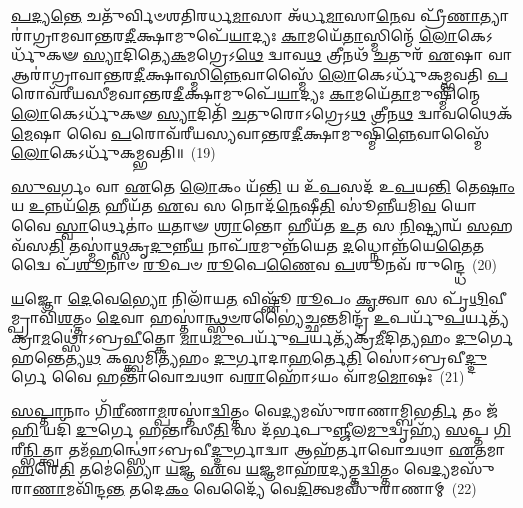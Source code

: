 \-\ul{𑌪}\-\-\ul{𑌦𑍍𑌯}\-\-\ul{𑌨𑍍𑌤𑍇} 𑌚𑌤𑍁᳴𑌰𑍍𑌵𑌿𑍞𑌶𑌤𑌿𑌰𑌰𑍍𑌧\-\ul{𑌮𑌾}\-𑌸𑌾 𑌅᳴𑌰𑍍𑌧\-\ul{𑌮𑌾}\-𑌸𑌾\-\ul{𑌨𑍇}\-𑌵 𑌪𑍍𑌰𑍀᳴\-\ul{𑌣𑌾}\-𑌤𑍍𑌯𑌾𑌰𑌾॑𑌗𑍍𑌰𑌾𑌮𑌵𑌾𑌨𑍍𑌤𑌰\-\ul{𑌦𑍀}\-𑌕𑍍𑌷𑌾𑌮𑍁𑌪𑍇᳴\-\ul{𑌯𑌾}\-𑌦𑍍𑌯𑌃 \ul{𑌕𑌾}\-𑌮𑌯𑍇᳴\-\ul{𑌤𑌾}\-𑌸𑍍𑌮𑌿𑌨𑍍𑌮𑍇᳴ \ul{𑌲𑍋}\-𑌕𑍇\-𑌽𑌰𑍍𑌧𑍁᳴𑌕𑍟 \ul{𑌸𑍍𑌯𑌾}\-𑌦𑌿𑌤𑍍𑌯𑍇\-\ul{𑌕}\-𑌮𑌗𑍍𑌰𑍇\-𑌽\-\ul{𑌥𑍇} 𑌦𑍍𑌵𑌾𑌵\-\ul{𑌥} 𑌤𑍍𑌰𑍀𑌨𑌥᳴ \ul{𑌚}\-𑌤𑍁𑌰᳴ \ul{𑌏}\-𑌷𑌾 𑌵𑌾 𑌆𑌰𑌾॑𑌗𑍍𑌰𑌾𑌵𑌾𑌨𑍍𑌤𑌰\-\ul{𑌦𑍀}\-𑌕𑍍𑌷𑌾𑌸𑍍𑌮𑌿\-\ul{𑌨𑍍𑌨𑍇}\-𑌵𑌾𑌸𑍍𑌮𑍈᳴ \ul{𑌲𑍋}\-𑌕𑍇\-𑌽𑌰𑍍𑌧𑍁᳴𑌕𑌮𑍍𑌭𑌵𑌤𑌿 \ul{𑌪}\-𑌰𑍋𑌵᳴𑌰𑍀𑌯𑌸𑍀𑌮𑌵𑌾𑌨𑍍𑌤𑌰\-\ul{𑌦𑍀}\-𑌕𑍍𑌷𑌾𑌮𑍁𑌪𑍇᳴\-\ul{𑌯𑌾}\-𑌦𑍍𑌯𑌃 \ul{𑌕𑌾}\-𑌮𑌯𑍇᳴\-\ul{𑌤𑌾}\-𑌮𑍁𑌷𑍍𑌮𑌿᳴𑌨𑍍𑌮𑍇 \ul{𑌲𑍋}\-𑌕𑍇\-𑌽𑌰𑍍𑌧𑍁᳴𑌕𑍟 \ul{𑌸𑍍𑌯𑌾}\-𑌦𑌿𑌤𑌿᳴ \ul{𑌚}\-𑌤𑍁𑌰𑍋\-𑌽𑌗𑍍𑌰𑍇\-𑌽\-\ul{𑌥} 𑌤𑍍𑌰𑍀𑌨\-\ul{𑌥} 𑌦𑍍𑌵𑌾𑌵𑌥𑍈𑌕᳴\-\ul{𑌮𑍇}\-𑌷𑌾 𑌵𑍈 \ul{𑌪}\-𑌰𑍋𑌵᳴𑌰𑍀𑌯𑌸𑍍𑌯𑌵𑌾𑌨𑍍𑌤𑌰\-\ul{𑌦𑍀}\-𑌕𑍍𑌷𑌾𑌮𑍁𑌷𑍍𑌮𑌿᳴\-\ul{𑌨𑍍𑌨𑍇}\-𑌵𑌾𑌸𑍍𑌮𑍈᳴ \ul{𑌲𑍋}\-𑌕𑍇\-𑌽𑌰𑍍𑌧𑍁᳴𑌕𑌮𑍍𑌭𑌵𑌤𑌿॥~(19)

{\anuvakamend[{\-\ul{𑌅}\-\-\ul{𑌸𑌿}\-\-\ul{𑌷𑍍𑌯}\-𑌤𑍀𑌤𑌿᳴ 𑌜𑍁\-\ul{𑌹𑍁}\-𑌯𑌾\-\ul{𑌥𑍍𑌸𑌾}\-𑌯𑌮𑍍𑌪𑍍𑌰𑌾᳴𑌤𑌰𑍁\-\ul{𑌪}\-𑌸\-\ul{𑌦}\-𑌶𑍍𑌚𑌤𑍁᳴𑌰𑍍𑌵𑌿𑍞𑌶\-\ul{𑌤𑌿𑌃} 𑌸\-\ul{𑌞𑍍𑌚}\-𑌤𑍁𑌰𑍋\-𑌽\-\ul{𑌗𑍍𑌰𑍇} 𑌷𑍋𑌡᳴𑌶 𑌚}]}%

\-\ul{𑌸𑍁}\-\-\ul{𑌵}\-𑌰𑍍𑌗𑌂 𑌵𑌾 \ul{𑌏}\-𑌤𑍇 \ul{𑌲𑍋}\-𑌕𑌂 𑌯᳴\-\ul{𑌨𑍍𑌤𑌿} 𑌯 𑌉᳴\-\ul{𑌪}\-𑌸𑌦᳴ 𑌉\-\ul{𑌪}\-𑌯\-\ul{𑌨𑍍𑌤𑌿} 𑌤𑍇\-\ul{𑌷𑌾𑌂} 𑌯 \ul{𑌉}\-𑌨𑍍𑌨𑌯᳴\-\ul{𑌤𑍇} 𑌹𑍀𑌯᳴𑌤 \ul{𑌏}\-𑌵 𑌸 𑌨𑍋𑌦᳴\-\ul{𑌨𑍇}\-𑌷𑍀\-\ul{𑌤𑌿} 𑌸𑍂॑𑌨𑍍𑌨𑍀𑌯𑌮𑌿\-\ul{𑌵} 𑌯𑍋 𑌵𑍈 \ul{𑌸𑍍𑌵𑌾}\-𑌰𑍍𑌥𑍇𑌤𑌾॑𑌂 \ul{𑌯}\-𑌤𑌾𑍟 \ul{𑌶𑍍𑌰𑌾}\-𑌨𑍍𑌤𑍋 𑌹𑍀𑌯᳴𑌤 \ul{𑌉}\-𑌤 𑌸 \ul{𑌨𑌿}\-𑌷𑍍𑌟𑍍𑌯𑌾𑌯᳴ \ul{𑌸}\-𑌹 𑌵᳴𑌸\-\ul{𑌤𑌿} 𑌤𑌸𑍍𑌮𑌾॑\-\ul{𑌥𑍍𑌸}\-𑌕𑍃\-\ul{𑌦𑍁}\-𑌨𑍍𑌨𑍀\-\ul{𑌯} 𑌨𑌾𑌪᳴\-\ul{𑌰}\-𑌮𑍁𑌨𑍍𑌨᳴𑌯𑍇𑌤 \ul{𑌦}\-𑌧𑍍𑌨𑍋𑌨𑍍𑌨᳴𑌯𑍇\-\ul{𑌤𑍈}\-𑌤𑌦𑍍𑌵𑍈 𑌪᳴\-\ul{𑌶𑍂}\-𑌨𑌾𑍞 \ul{𑌰𑍂}\-𑌪𑍞 \ul{𑌰𑍂}\-𑌪𑍇\-\ul{𑌣𑍈}\-𑌵 \ul{𑌪}\-𑌶𑍂𑌨𑌵᳴ 𑌰𑍁𑌨𑍍𑌦𑍍𑌧𑍇~(20)

\-\ul{𑌯}\-𑌜𑍍𑌞𑍋 \ul{𑌦𑍇}\-𑌵𑍇\-\ul{𑌭𑍍𑌯𑍋} 𑌨𑌿𑌲𑌾᳴𑌯\-\ul{𑌤} 𑌵𑌿𑌷𑍍𑌣𑍂᳴ \ul{𑌰𑍂}\-𑌪𑌂 \ul{𑌕𑍃}\-𑌤𑍍𑌵𑌾 𑌸 𑌪𑍃᳴\-\ul{𑌥𑌿}\-𑌵𑍀𑌮𑍍𑌪𑍍𑌰𑌾𑌵𑌿᳴\-\ul{𑌶}\-𑌤𑍍𑌤𑌂 \ul{𑌦𑍇}\-𑌵𑌾 𑌹𑌸𑍍𑌤𑌾॑\-\ul{𑌨𑍍𑌥𑍍𑌸}\-\-\ul{𑍞}\-𑌰𑌭𑍍𑌯𑍈॑\-\ul{𑌚𑍍𑌛}\-𑌨𑍍𑌤𑌮𑌿𑌨𑍍𑌦𑍍𑌰᳴ \ul{𑌉}\-𑌪𑌰𑍍𑌯𑍁᳴\-\ul{𑌪}\-𑌰𑍍𑌯𑌤𑍍𑌯᳴𑌕𑍍𑌰𑌾\-\ul{𑌮}\-𑌥𑍍𑌸𑍋॑\-𑌽𑌬𑍍𑌰\-\ul{𑌵𑍀}\-𑌤𑍍𑌕𑍋 \ul{𑌮𑌾}\-𑌯\-\ul{𑌮𑍁}\-𑌪𑌰𑍍𑌯𑍁᳴\-\ul{𑌪}\-𑌰𑍍𑌯𑌤𑍍𑌯᳴𑌕𑍍𑌰\-\ul{𑌮𑍀}\-𑌦𑌿\-\ul{𑌤𑍍𑌯}\-𑌹𑌂 \ul{𑌦𑍁}\-𑌰𑍍𑌗𑍇 𑌹𑌨𑍍𑌤𑍇𑌤𑍍𑌯\-\ul{𑌥} 𑌕𑌸𑍍𑌤𑍍𑌵𑌮𑌿\-\ul{𑌤𑍍𑌯}\-𑌹𑌂 \ul{𑌦𑍁}\-𑌰𑍍𑌗𑌾𑌦𑌾\-\ul{𑌹}\-𑌰𑍍𑌤𑍇\-\ul{𑌤𑌿} 𑌸𑍋॑\-𑌽𑌬𑍍𑌰𑌵𑍀\-\ul{𑌦𑍍𑌦𑍁}\-𑌰𑍍𑌗𑍇 𑌵𑍈 𑌹𑌨𑍍𑌤𑌾᳴𑌵𑍋𑌚𑌥𑌾 𑌵\-\ul{𑌰𑌾}\-𑌹𑍋᳴\-𑌽𑌯𑌂 𑌵𑌾᳴𑌮\-\ul{𑌮𑍋}\-𑌷𑌃~(21)

\-\ul{𑌸}\-\-\ul{𑌪𑍍𑌤𑌾}\-𑌨𑌾𑌂 𑌗𑌿᳴\-\ul{𑌰𑍀}\-𑌣𑌾\-\ul{𑌮𑍍𑌪}\-𑌰𑌸𑍍𑌤𑌾॑\-\ul{𑌦𑍍𑌵𑌿}\-𑌤𑍍𑌤𑌂 𑌵𑍇\-\ul{𑌦𑍍𑌯}\-𑌮𑌸𑍁᳴𑌰𑌾𑌣𑌾𑌮𑍍𑌬𑌿𑌭\-\ul{𑌰𑍍𑌤𑌿} 𑌤𑌂 𑌜᳴\-\ul{𑌹𑌿} 𑌯𑌦𑌿᳴ \ul{𑌦𑍁}\-𑌰𑍍𑌗𑍇 𑌹𑌨𑍍𑌤𑌾𑌸𑍀\-\ul{𑌤𑌿} 𑌸 𑌦᳴𑌰𑍍𑌭𑌪𑍁\-\ul{𑌞𑍍𑌜𑍀}\-𑌲\-\ul{𑌮𑍁}\-𑌦𑍍𑌵𑍃𑌹𑍍𑌯᳴ \ul{𑌸}\-𑌪𑍍𑌤 \ul{𑌗𑌿}\-𑌰𑍀\-\ul{𑌨𑍍𑌭𑌿}\-𑌤𑍍𑌤𑍍𑌵𑌾 𑌤𑌮᳴\-\ul{𑌹}\-𑌨𑍍𑌥𑍍𑌸𑍋॑\-𑌽𑌬𑍍𑌰𑌵𑍀\-\ul{𑌦𑍍𑌦𑍁}\-𑌰𑍍𑌗𑌾𑌦𑍍𑌵𑌾 𑌆𑌹᳴𑌰𑍍𑌤𑌾𑌵𑍋𑌚𑌥𑌾 \ul{𑌏}\-𑌤𑌮𑌾 \ul{𑌹}\-𑌰𑍇\-\ul{𑌤𑌿} 𑌤𑌮𑍇॑𑌭𑍍𑌯𑍋 \ul{𑌯}\-𑌜𑍍𑌞 \ul{𑌏}\-𑌵 \ul{𑌯}\-𑌜𑍍𑌞𑌮𑌾𑌹᳴\-\ul{𑌰}\-𑌦𑍍𑌯𑌤𑍍𑌤\-\ul{𑌦𑍍𑌵𑌿}\-𑌤𑍍𑌤𑌂 𑌵𑍇\-\ul{𑌦𑍍𑌯}\-𑌮𑌸𑍁᳴𑌰𑌾\-\ul{𑌣𑌾}\-𑌮𑌵𑌿᳴𑌨𑍍𑌦\-\ul{𑌨𑍍𑌤} 𑌤𑌦𑍇\-\ul{𑌕𑌂} 𑌵𑍇𑌦𑍍𑌯𑍈᳴ 𑌵𑍇\-\ul{𑌦𑌿}\-𑌤𑍍𑌵𑌮𑌸𑍁᳴𑌰𑌾𑌣𑌾𑌮𑍍~(22)

